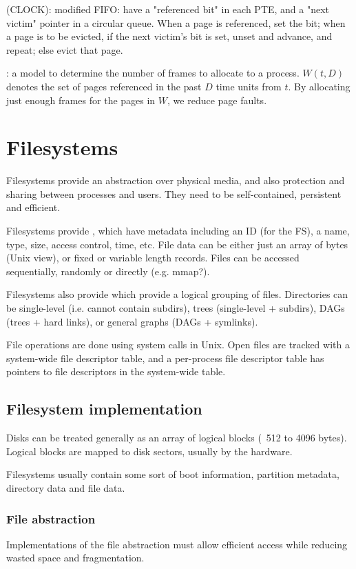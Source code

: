 \documentclass[fontsize=9pt,twoside]{slnotes}
\begin{document}
 (CLOCK): modified FIFO: have a "referenced bit" in each PTE, and a "next victim" pointer in a circular queue. When a page is referenced, set the bit; when a page is to be evicted, if the next victim's bit is set, unset and advance, and repeat; else evict that page.

: a model to determine the number of frames to allocate to a process. \(W(t, D)\) denotes the set of pages referenced in the past \(D\) time units from \(t\). By allocating just enough frames for the pages in \(W\), we reduce page faults.

\chapter{Filesystems}
Filesystems provide an abstraction over physical media, and also protection and sharing between processes and users. They need to be self-contained, persistent and efficient.

Filesystems provide , which have metadata including an ID (for the FS), a name, type, size, access control, time, etc. File data can be either just an array of bytes (Unix view), or fixed or variable length records. Files can be accessed sequentially, randomly or directly (e.g. mmap?).

Filesystems also provide  which provide a logical grouping of files. Directories can be single-level (i.e. cannot contain subdirs), trees (single-level + subdirs), DAGs (trees + hard links), or general graphs (DAGs + symlinks).

File operations are done using system calls in Unix. Open files are tracked with a system-wide file descriptor table, and a per-process file descriptor table has pointers to file descriptors in the system-wide table.

\section{Filesystem implementation}
Disks can be treated generally as an array of logical blocks (~512 to 4096 bytes). Logical blocks are mapped to disk sectors, usually by the hardware.

Filesystems usually contain some sort of boot information, partition metadata, directory data and file data.

\subsection{File abstraction}
Implementations of the file abstraction must allow efficient access while reducing wasted space and fragmentation.
\end{document}

